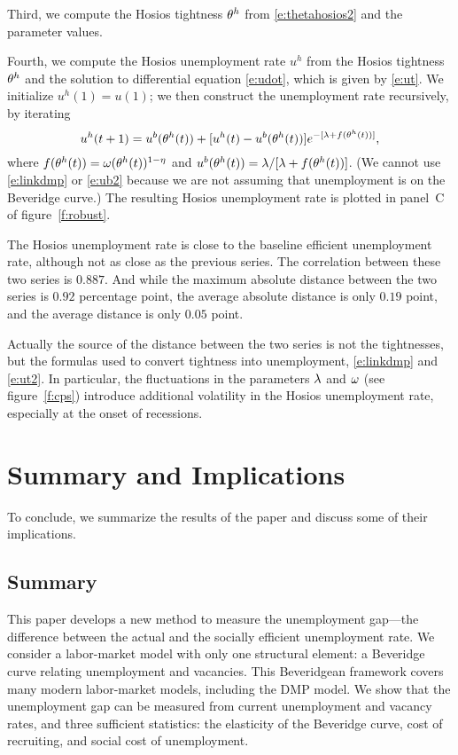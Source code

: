 \documentclass[letterpaper,12pt,leqno]{article}
\begin{document}
Third, we compute the Hosios tightness $\theta^h$ from \eqref{e:thetahosios2} and the parameter values.

Fourth, we compute the Hosios unemployment rate $u^h$ from the Hosios tightness $\theta^h$ and the solution to differential equation \eqref{e:udot}, which is given by \eqref{e:ut}. We initialize $u^h(1)= u(1)$; we then construct the unemployment rate recursively, by iterating
\begin{equation}
u^h(t+1) = u^b(\theta^h(t)) + [u^h(t) - u^b(\theta^h(t))] e^{-[\lambda+f(\theta^h(t))]},
\label{e:ut2}\end{equation}
where $f(\theta^h(t)) = \omega (\theta^h(t))^{1-\eta}$ and $u^b(\theta^h(t)) =\lambda/[\lambda + f(\theta^h(t))]$. (We cannot use \eqref{e:linkdmp} or \eqref{e:ub2} because we are not assuming that unemployment is on the Beveridge curve.) The resulting Hosios unemployment rate is plotted in panel~C of figure~\ref{f:robust}.

The Hosios unemployment rate is close to the baseline efficient unemployment rate, although not as close as the previous series. The correlation between these two series is $0.887$. And while the maximum absolute distance between the two series is $0.92$  percentage point, the average absolute distance is only $0.19$ point, and the average distance is only $0.05$ point. 

Actually the source of the distance between the two series is not the tightnesses, but the formulas used to convert tightness into unemployment, \eqref{e:linkdmp} and \eqref{e:ut2}. In particular, the fluctuations in the parameters $\lambda$ and $\omega$ (see figure~\ref{f:cps}) introduce additional volatility in the Hosios unemployment rate, especially at the onset of recessions.

\section{Summary and Implications}

To conclude, we summarize the results of the paper and discuss some of their implications.

\subsection{Summary}

This paper develops a new method to measure the unemployment gap---the difference between the actual and the socially efficient unemployment rate. We consider a labor-market model with only one structural element: a Beveridge curve relating unemployment and vacancies. This Beveridgean framework covers many modern labor-market models, including the DMP model. We show that the unemployment gap can be measured from current unemployment and vacancy rates, and three sufficient statistics: the elasticity of the Beveridge curve, cost of recruiting, and social cost of unemployment. 
\end{document}
